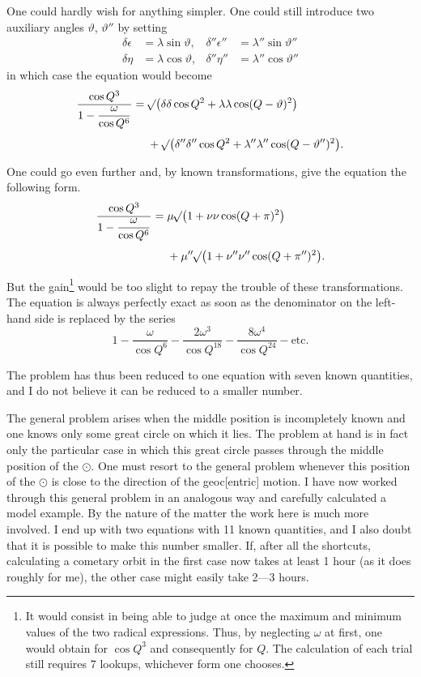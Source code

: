 One could hardly wish for anything simpler. One could still introduce two auxiliary angles \(\vartheta\), \(\vartheta''\) by setting
\[
\begin{aligned}
\delta\epsilon&=\lambda\sin\vartheta, &\delta''\epsilon''&=\lambda''\sin\vartheta''\\
\delta\eta&=\lambda\cos\vartheta, &\delta''\eta''&=\lambda''\cos\vartheta''
\end{aligned}
\]
in which case the equation would become
\[
\begin{aligned}
\frac{\cos Q^3}{1-\dfrac\omega{\cos Q^6}}={}&\mathord{{}^{}\!\surd}\bigl(\delta\delta\cos Q^2+\lambda\lambda\cos(Q-\vartheta)^2\bigr)\\[4pt]
&+\mathord{{}^{}\!\surd}\bigl(\delta''\delta''\cos Q^2+\lambda''\lambda''\cos(Q-\vartheta'')^2\bigr).
\end{aligned}
\]

One could go even further and, by known transformations, give the equation the following form.
\[
\begin{aligned}
\frac{\cos Q^3}{1-\dfrac\omega{\cos Q^6}}={}&\mu\mathord{{}^{}\!\surd}\bigl(1+\nu\nu\cos(Q+\pi)^2\bigr)\\[4pt]
&+\mu''\mathord{{}^{}\!\surd}\bigl(1+\nu''\nu''\cos(Q+\pi'')^2\bigr).
\end{aligned}
\]

But the gain\footnote{It would consist  in being able to judge at once the maximum and minimum values of the two radical expressions. Thus, by neglecting \(\omega\) at first, one would obtain  for \(\cos Q^3\) and consequently for \(Q\). The calculation of each trial still requires 7 lookups, whichever form one chooses.} would be too slight to repay the trouble of these transformations. The equation is always perfectly exact as soon as the denominator on the left-hand side is replaced by the series
\[
1-\frac\omega{\cos Q^6}-\frac{2\omega^3}{\cos Q^{18}}-\frac{8\omega^4}{\cos Q^{24}}-\text{etc.}
\]

The problem has thus been reduced to one equation with seven known quantities, and I do not believe it can be reduced to a smaller number.

The general problem arises when the middle position is incompletely known and one knows only some great circle on which it lies. The problem at hand is in fact only the particular case in which this great circle passes through the middle position of the \(\odot\). One must resort to the general problem whenever this position of the \(\odot\) is close to the direction of the geoc[entric] motion. I have now worked through this general problem in an analogous way and carefully calculated a model example\HistoricalNoteEight{See the following note.]}. By the nature of the matter the work here is much more involved. I end up with two equations with 11 known quantities, and I also doubt that it is possible to make this number smaller. If, after all the shortcuts, calculating a cometary orbit in the first case now takes at least 1 hour (as it does roughly for me), the other case might easily take 2—3 hours.
\par\medskip\noindent\makebox[\linewidth]{\rule{.18\linewidth}{.35pt}}\par
